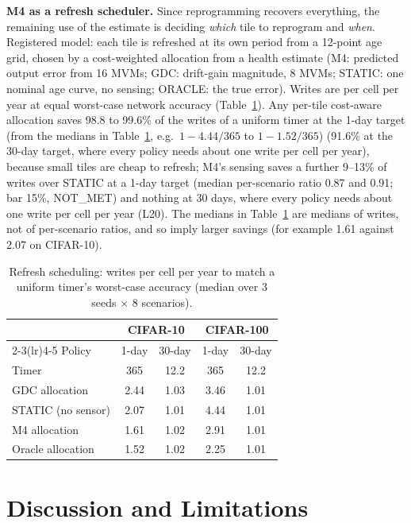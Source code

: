 \documentclass[journal]{IEEEtran}
\newcommand{\mfour}{\textsc{M4}}
\begin{document}
\textbf{\mfour{} as a refresh scheduler.} Since reprogramming recovers everything, the remaining use of the estimate is deciding \emph{which} tile to reprogram and \emph{when}. Registered model: each tile is refreshed at its own period from a 12-point age grid, chosen by a cost-weighted allocation from a health estimate (\mfour: predicted output error from 16 MVMs; GDC: drift-gain magnitude, 8 MVMs; STATIC: one nominal age curve, no sensing; ORACLE: the true error). Writes are per cell per year at equal worst-case network accuracy (Table~\ref{tab:h6}).
Any per-tile cost-aware allocation saves 98.8 to 99.6\% of the writes of a uniform timer at the 1-day target (from the medians in Table~\ref{tab:h6}, e.g.\ $1-4.44/365$ to $1-1.52/365$) (91.6\% at the 30-day target, where every policy needs about one write per cell per year), because small tiles are cheap to refresh; \mfour's sensing saves a further 9--13\% of writes over STATIC at a 1-day target (median per-scenario ratio 0.87 and 0.91; bar 15\%, NOT\_MET) and nothing at 30 days, where every policy needs about one write per cell per year (L20). The medians in Table~\ref{tab:h6} are medians of writes, not of per-scenario ratios, and so imply larger savings (for example 1.61 against 2.07 on CIFAR-10).

\begin{table}[t]
\caption{Refresh scheduling: writes per cell per year to match a uniform timer's worst-case accuracy (median over 3 seeds $\times$ 8 scenarios).}
\label{tab:h6}
\centering\footnotesize
\begin{tabular}{lcccc}
\toprule
 & \multicolumn{2}{c}{CIFAR-10} & \multicolumn{2}{c}{CIFAR-100} \\
\cmidrule(lr){2-3}\cmidrule(lr){4-5}
Policy & 1-day & 30-day & 1-day & 30-day \\
\midrule
Timer & 365 & 12.2 & 365 & 12.2 \\
GDC allocation & 2.44 & 1.03 & 3.46 & 1.01 \\
STATIC (no sensor) & 2.07 & 1.01 & 4.44 & 1.01 \\
\mfour{} allocation & 1.61 & 1.02 & 2.91 & 1.01 \\
Oracle allocation & 1.52 & 1.02 & 2.25 & 1.01 \\
\bottomrule
\end{tabular}
\end{table}

\section{Discussion and Limitations}
\label{sec:discussion}
\end{document}
